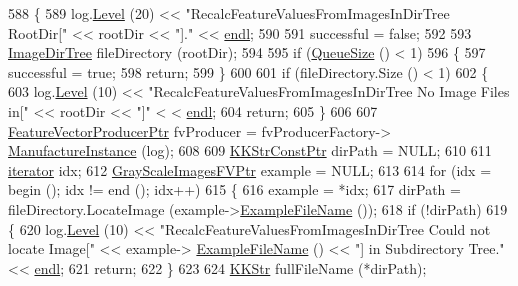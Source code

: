 \begin{DoxyCode}
588 \{
589   log.\hyperlink{class_k_k_b_1_1_run_log_a32cf761d7f2e747465fd80533fdbb659}{Level} (20) << \textcolor{stringliteral}{"RecalcFeatureValuesFromImagesInDirTree   RootDir["} << rootDir << \textcolor{stringliteral}{"]."} << 
      \hyperlink{namespace_k_k_b_ad1f50f65af6adc8fa9e6f62d007818a8}{endl};
590 
591   successful = \textcolor{keyword}{false};
592 
593   \hyperlink{class_k_k_b_1_1_image_dir_tree}{ImageDirTree}   fileDirectory (rootDir);
594 
595   \textcolor{keywordflow}{if}  (\hyperlink{class_k_k_b_1_1_k_k_queue_a1dab601f75ee6a65d97f02bddf71c40d}{QueueSize} () < 1)
596   \{
597     successful = \textcolor{keyword}{true};
598     \textcolor{keywordflow}{return};
599   \}
600 
601   \textcolor{keywordflow}{if}  (fileDirectory.Size () < 1)
602   \{
603     log.\hyperlink{class_k_k_b_1_1_run_log_a32cf761d7f2e747465fd80533fdbb659}{Level} (10) << \textcolor{stringliteral}{"RecalcFeatureValuesFromImagesInDirTree  No Image Files in["} << rootDir << \textcolor{stringliteral}{"]"} <
      < \hyperlink{namespace_k_k_b_ad1f50f65af6adc8fa9e6f62d007818a8}{endl};
604     \textcolor{keywordflow}{return};
605   \}
606 
607   \hyperlink{class_k_k_m_l_l_1_1_feature_vector_producer}{FeatureVectorProducerPtr}  fvProducer = fvProducerFactory->
      \hyperlink{class_k_k_m_l_l_1_1_factory_f_v_producer_ab69f27aed9bda4917326580ec824e749}{ManufactureInstance} (log);
608 
609   \hyperlink{class_k_k_b_1_1_k_k_str}{KKStrConstPtr}  dirPath = NULL;
610 
611   \hyperlink{class_k_k_b_1_1_k_k_queue_aa3c2796a726eea468b94132a9fbf2cfe}{iterator}  idx;
612   \hyperlink{class_k_k_m_l_l_1_1_gray_scale_images_f_v}{GrayScaleImagesFVPtr}  example = NULL;
613 
614   \textcolor{keywordflow}{for}  (idx = begin ();   idx != end ();  idx++)
615   \{
616     example = *idx;
617     dirPath = fileDirectory.LocateImage (example->\hyperlink{class_k_k_m_l_l_1_1_feature_vector_ab47c89ab1e9396664fdc0dc34b6e1ab5}{ExampleFileName} ());
618     \textcolor{keywordflow}{if}  (!dirPath)
619     \{
620       log.\hyperlink{class_k_k_b_1_1_run_log_a32cf761d7f2e747465fd80533fdbb659}{Level} (10) << \textcolor{stringliteral}{"RecalcFeatureValuesFromImagesInDirTree  Could not locate Image["} << example->
      \hyperlink{class_k_k_m_l_l_1_1_feature_vector_ab47c89ab1e9396664fdc0dc34b6e1ab5}{ExampleFileName} () << \textcolor{stringliteral}{"] in Subdirectory Tree."} << \hyperlink{namespace_k_k_b_ad1f50f65af6adc8fa9e6f62d007818a8}{endl};
621       \textcolor{keywordflow}{return};
622     \}
623 
624     \hyperlink{class_k_k_b_1_1_k_k_str}{KKStr}  fullFileName (*dirPath);

\end{DoxyCode}
